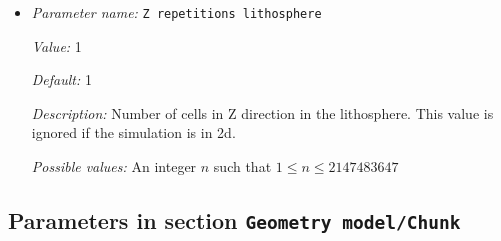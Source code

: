 \begin{itemize}
{\it Possible values:} An integer $n$ such that $1\leq n \leq 2147483647$
\item {\it Parameter name:} {\tt Z repetitions lithosphere}
\label{parameters:Geometry model/Box with lithosphere boundary indicators/Z repetitions lithosphere}
\label{parameters:Geometry_20model/Box_20with_20lithosphere_20boundary_20indicators/Z_20repetitions_20lithosphere}


{\it Value:} 1


{\it Default:} 1


{\it Description:} Number of cells in Z direction in the lithosphere. This value is ignored if the simulation is in 2d.


{\it Possible values:} An integer $n$ such that $1\leq n \leq 2147483647$
\end{itemize}

\subsection{Parameters in section \tt Geometry model/Chunk}
\label{parameters:Geometry_20model/Chunk}

